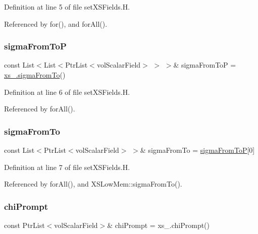 Definition at line 5 of file set\+X\+S\+Fields.\+H.



Referenced by for(), and for\+All().

\mbox{\label{setXSFields_8H_a67e262e215bebd61694a35e533ab6495}} 
\subsubsection{\texorpdfstring{sigma\+From\+ToP}{sigmaFromToP}}
{\footnotesize\ttfamily const List$<$List$<$Ptr\+List$<$vol\+Scalar\+Field$>$ $>$ $>$\& sigma\+From\+ToP = \hyperlink{setXSFields_8H_a5cbb3e3ec5e74f9ccd323dc231c96525}{xs\+\_\+.\+sigma\+From\+To}()}



Definition at line 6 of file set\+X\+S\+Fields.\+H.



Referenced by for\+All().

\mbox{\label{setXSFields_8H_a5cbb3e3ec5e74f9ccd323dc231c96525}} 
\subsubsection{\texorpdfstring{sigma\+From\+To}{sigmaFromTo}}
{\footnotesize\ttfamily const List$<$Ptr\+List$<$vol\+Scalar\+Field$>$ $>$\& sigma\+From\+To = \hyperlink{setXSFields_8H_a67e262e215bebd61694a35e533ab6495}{sigma\+From\+ToP}\mbox{[}0\mbox{]}}



Definition at line 7 of file set\+X\+S\+Fields.\+H.



Referenced by for\+All(), and X\+S\+Low\+Mem\+::sigma\+From\+To().

\mbox{\label{setXSFields_8H_ae99cb941c26b8d02c30336ffe9d73cd2}} 
\subsubsection{\texorpdfstring{chi\+Prompt}{chiPrompt}}
{\footnotesize\ttfamily const Ptr\+List$<$vol\+Scalar\+Field$>$\& chi\+Prompt = xs\+\_\+.\+chi\+Prompt()}



